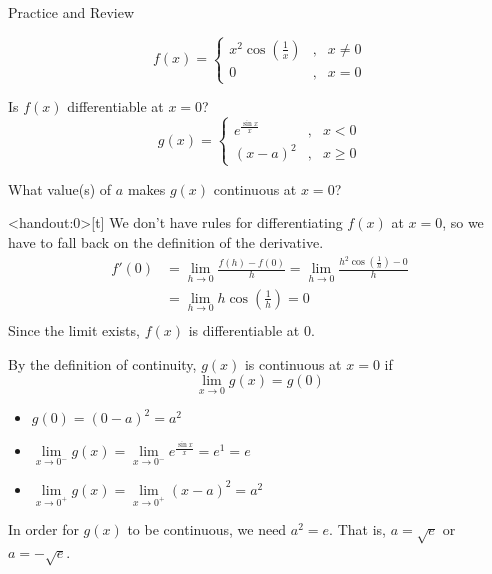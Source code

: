 \begin{frame}
Practice and Review
\end{frame}
\begin{frame}[t]\AnswerYes
\[f(x)=\left\{\begin{array}{ccc}
x^2\cos\left(\frac{1}{x}\right)&,&x \neq 0\\
0 & , & x=0
\end{array}\right.\]

Is $f(x)$ differentiable at $x=0$?
\vfill
\[g(x)=\left\{\begin{array}{ccc}
e^{\frac{\sin x}{x}}&,&x < 0\\
(x-a)^2 & , & x\ge 0
\end{array}\right.\]

What value(s) of $a$ makes $g(x)$ continuous at $x=0$?

\vfill
{}
\end{frame}
\begin{frame}<handout:0>[t]
\color{answercolor}
We don't have rules for differentiating $f(x)$ at $x=0$, so we have to fall back on the definition of the derivative.
\begin{align*}
f'(0)&=\lim_{h \to 0}\frac{f(h)-f(0)}{h} = \lim_{h\to 0}\frac{h^2\cos\left(\frac1h\right)-0}{h}\\
&= \lim_{h\to 0} h\cos\left(\frac1h\right)=0\\
\end{align*}
Since the limit exists, $f(x)$ is differentiable at 0.
\vfill

\color{C1}
By the definition of continuity, $g(x)$ is continuous at $x=0$ if
\[\lim_{x \to 0}g(x)=g(0)\]
\begin{itemize}\color{answercolor}
\item $g(0)=(0-a)^2=a^2$
\item $\lim\limits_{x \to 0^-}g(x) = \lim\limits_{x \to 0^-}e^{\frac{\sin x}{x}} = e^1=e$
\item $\lim\limits_{x \to 0^+}g(x) = \lim\limits_{x \to 0^+}(x-a)^2 = a^2$
\end{itemize}
In order for $g(x)$ to be continuous, we need $a^2=e$. That is, $a=\sqrt e$ or $a=-\sqrt e$.
\end{frame}

